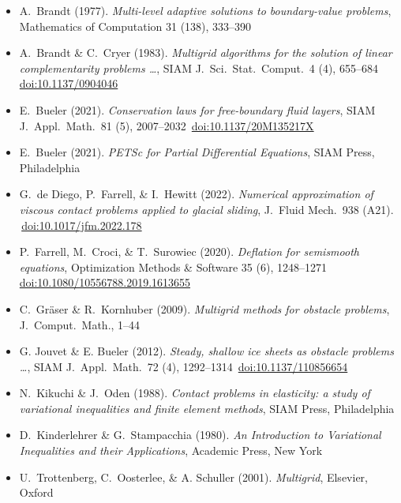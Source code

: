 
\newcommand{\sdoi}[1]{\,{\tiny \href{https://doi.org/#1}{doi:#1}}}
\begin{itemize}
\item[] A.~Brandt (1977). \emph{Multi-level adaptive solutions to boundary-value problems}, Mathematics of Computation 31 (138), 333--390
\item[] A.~Brandt \& C.~Cryer (1983). \emph{Multigrid algorithms for the solution of linear complementarity problems \dots}, SIAM J.~Sci.~Stat.~Comput.~4 (4), 655--684 \sdoi{10.1137/0904046}
\item[] E.~Bueler (2021). \emph{Conservation laws for free-boundary fluid layers}, SIAM J.~Appl.~Math.~81 (5), 2007--2032 \sdoi{10.1137/20M135217X}
\item[] E.~Bueler (2021). \emph{PETSc for Partial Differential Equations}, SIAM Press, Philadelphia
\item[] G.~de Diego, P.~Farrell, \& I.~Hewitt (2022). \emph{Numerical approximation of viscous contact problems applied to glacial sliding}, J.~Fluid Mech.~938 (A21). \sdoi{10.1017/jfm.2022.178}
\item[] P.~Farrell, M.~Croci, \& T.~Surowiec (2020). \emph{Deflation for semismooth equations}, Optimization Methods \& Software 35 (6), 1248--1271 \sdoi{10.1080/10556788.2019.1613655}
\item[] C.~Gr{\"a}ser \& R.~Kornhuber (2009). \emph{Multigrid methods for obstacle problems}, J.~Comput.~Math., 1--44
\item[] G. Jouvet \& E. Bueler (2012). \emph{Steady, shallow ice sheets as obstacle problems \dots}, SIAM J.~Appl.~Math.~72 (4), 1292--1314 \sdoi{10.1137/110856654}
\item[] N.~Kikuchi \& J.~Oden (1988).  \emph{Contact problems in elasticity: a study of variational inequalities and finite element methods}, SIAM Press, Philadelphia
\item[] D.~Kinderlehrer \& G.~Stampacchia (1980). \emph{An Introduction to Variational Inequalities and their Applications}, Academic Press, New York
\item[] U.~Trottenberg, C.~Oosterlee, \& A. Schuller (2001).  \emph{Multigrid}, Elsevier, Oxford
\end{itemize}

